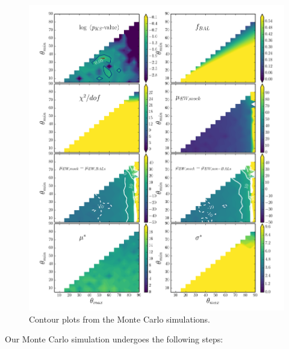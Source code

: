 \begin{figure} %
\centering
\includegraphics[width=1.0\textwidth]{figures/ewpaper/four_ew_o3_max_sdss.png}
\caption
{
Contour plots from the Monte Carlo simulations.
}
\label{fig:contour}
\end{figure} %

Our Monte Carlo simulation undergoes the following steps:

